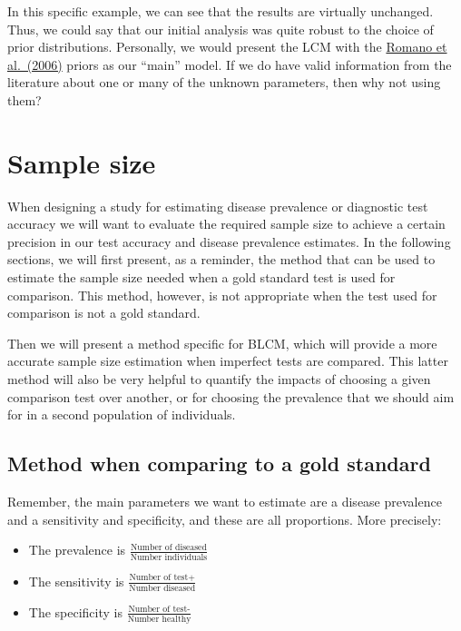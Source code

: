\documentclass[
]{book}
\begin{document}
In this specific example, we can see that the results are virtually unchanged. Thus, we could say that our initial analysis was quite robust to the choice of prior distributions. Personally, we would present the LCM with the \href{https://www.sciencedirect.com/science/article/pii/S0093691X06001543?via\%3Dihub}{Romano et al.~(2006)} priors as our ``main'' model. If we do have valid information from the literature about one or many of the unknown parameters, then why not using them?

\chapter{Sample size}\label{sample-size}

When designing a study for estimating disease prevalence or diagnostic test accuracy we will want to evaluate the required sample size to achieve a certain precision in our test accuracy and disease prevalence estimates. In the following sections, we will first present, as a reminder, the method that can be used to estimate the sample size needed when a gold standard test is used for comparison. This method, however, is not appropriate when the test used for comparison is not a gold standard.

Then we will present a method specific for BLCM, which will provide a more accurate sample size estimation when imperfect tests are compared. This latter method will also be very helpful to quantify the impacts of choosing a given comparison test over another, or for choosing the prevalence that we should aim for in a second population of individuals.

\section{Method when comparing to a gold standard}\label{method-when-comparing-to-a-gold-standard}

Remember, the main parameters we want to estimate are a disease prevalence and a sensitivity and specificity, and these are all proportions. More precisely:

\begin{itemize}
\item
  The prevalence is \(\frac{\text{Number of diseased}}{\text{Number individuals}}\)
\item
  The sensitivity is \(\frac{\text{Number of test+}}{\text{Number diseased}}\)
\item
  The specificity is \(\frac{\text{Number of test-}}{\text{Number healthy}}\)
\end{itemize}
\end{document}
